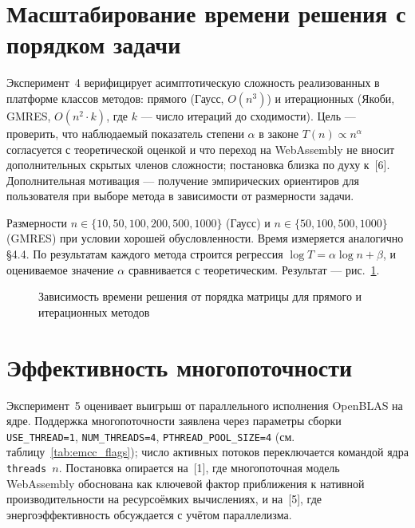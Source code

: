 \documentclass[12pt, oneside]{book}
\begin{document}
\section{Масштабирование времени решения с порядком задачи}
\label{sec:exp_scaling}

    \quad Эксперимент~4 верифицирует асимптотическую сложность реализованных в платформе классов методов: прямого (Гаусс, $O(n^3)$) и итерационных (Якоби, GMRES, $O(n^2 \cdot k)$, где $k$ --- число итераций до сходимости). Цель --- проверить, что наблюдаемый показатель степени $\alpha$ в законе $T(n) \propto n^\alpha$ согласуется с теоретической оценкой и что переход на WebAssembly не вносит дополнительных скрытых членов сложности; постановка близка по духу к~[6]. Дополнительная мотивация --- получение эмпирических ориентиров для пользователя при выборе метода в зависимости от размерности задачи.

    \quad Размерности $n \in \{10, 50, 100, 200, 500, 1000\}$ (Гаусс) и $n \in \{50, 100, 500, 1000\}$ (GMRES) при условии хорошей обусловленности. Время измеряется аналогично §4.4. По результатам каждого метода строится регрессия $\log T = \alpha \log n + \beta$, и оцениваемое значение $\alpha$ сравнивается с теоретическим. Результат --- рис.~\ref{fig:exp_scaling}.

\begin{figure}[htbp]
\centering
{}
\caption{Зависимость времени решения от порядка матрицы для прямого и итерационных методов}
\label{fig:exp_scaling}
\end{figure}

\section{Эффективность многопоточности}
\label{sec:exp_threads}

    \quad Эксперимент~5 оценивает выигрыш от параллельного исполнения OpenBLAS на ядре. Поддержка многопоточности заявлена через параметры сборки \texttt{USE\_THREAD=1}, \texttt{NUM\_THREADS=4}, \texttt{PTHREAD\_POOL\_SIZE=4} (см. таблицу~\ref{tab:emcc_flags}); число активных потоков переключается командой ядра \texttt{threads $n$}. Постановка опирается на~[1], где многопоточная модель WebAssembly обоснована как ключевой фактор приближения к нативной производительности на ресурсоёмких вычислениях, и на~[5], где энергоэффективность обсуждается с учётом параллелизма.
\end{document}
